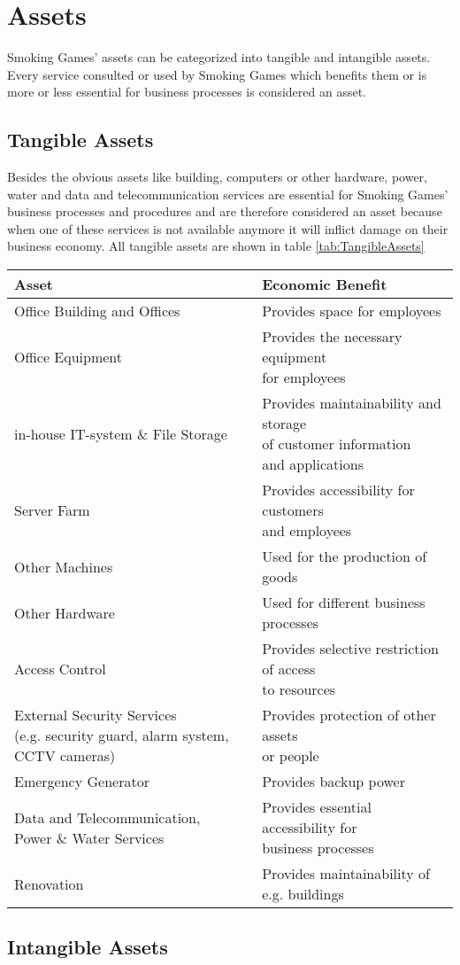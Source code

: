 \chapter{Assets}
Smoking Games' assets can be categorized into tangible and intangible assets. Every service consulted or used by Smoking Games which benefits them or is more or less essential for business processes is considered an asset.
\section{Tangible Assets}
Besides the obvious assets like building, computers or other hardware, power, water and data and telecommunication services are essential for Smoking Games' business processes and procedures and are therefore considered an asset because when one of these services is not available anymore it will inflict damage on their business economy. All tangible assets are shown in table \ref{tab:TangibleAssets}
\begin{center}
	\begin{tabular}{l | l}\label{tab:TangibleAssets}
		\textbf{Asset} & \textbf{Economic Benefit}\\\hline\hline
		Office Building and Offices & Provides space for employees\\\hline
		Office Equipment & \parbox[t]{7cm}{Provides the necessary equipment\\for employees}\\\hline
		in-house IT-system \& File Storage & \parbox[t]{7cm}{Provides maintainability and storage\\of customer information\\and applications}\\\hline
		Server Farm & \parbox[t]{7cm}{Provides accessibility for customers\\and employees}\\\hline
		Other Machines & Used for the production of goods\\\hline
		Other Hardware & \parbox[t]{7cm}{Used for different business processes}\\\hline
		Access Control & \parbox[t]{7cm}{Provides selective restriction of access\\to resources}\\\hline
		\parbox[t]{7cm}{External Security Services\\(e.g. security guard, alarm system, CCTV cameras)} & \parbox[t]{7cm}{Provides protection of other assets\\or people}\\\hline
		Emergency Generator & Provides backup power\\\hline
		\parbox[t]{8cm}{Data and Telecommunication,\\Power \& Water Services} & \parbox[t]{7cm}{Provides essential accessibility for\\business processes}\\\hline
		Renovation & \parbox[t]{7cm}{Provides maintainability of e.g. buildings}\\
	\end{tabular}
\end{center}
\section{Intangible Assets}
